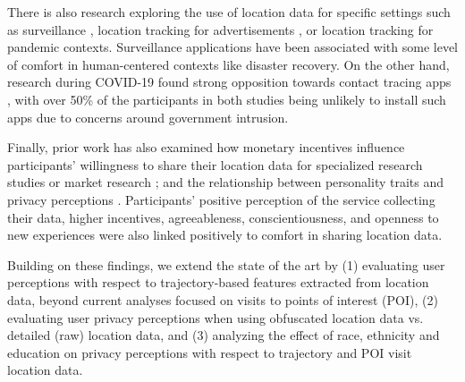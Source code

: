 


There is also research exploring the use of location data for specific settings such as surveillance  \cite{video_survellience,vox_privacy}, location tracking for advertisements \cite{location_advertisement}, 
or location tracking for pandemic contexts. 
Surveillance applications have been associated with some level of comfort in human-centered contexts like disaster recovery.
On the other hand, research during COVID-19 found strong opposition towards contact tracing apps \cite{privacy_covid,surveillance_covid,privacy_covid_2}, with over 50\% of the participants in both studies being unlikely to install such apps due to concerns around government intrusion. 

Finally, prior work has also examined how monetary incentives influence participants' willingness to share their location data for specialized research studies or market research \cite{incentive_participate_1, incentive_participate_2}; and the relationship between personality traits and privacy perceptions \cite{personality_location, personality_privacy_perception_2016}. Participants' positive perception of the service collecting their data, higher incentives, agreeableness, conscientiousness, and openness to new experiences were also linked positively to comfort in sharing location data.  

Building on these findings, we extend the state of the art by (1) evaluating user perceptions with respect to trajectory-based features extracted from location data, beyond current analyses focused on visits to points of interest (POI), (2) evaluating user privacy perceptions when using obfuscated location data vs. detailed (raw) location data, and (3) analyzing the effect of race, ethnicity and education on privacy perceptions with respect to trajectory and POI visit location data. 

